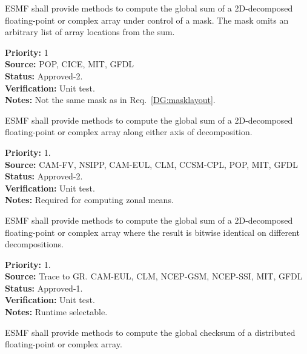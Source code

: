  \label{DG:masksum}

ESMF shall provide methods to compute the global sum of a 2D-decomposed
floating-point or complex array under control of a mask. The mask
omits an arbitrary list of array locations from the sum.

\begin{reqlist}
{\bf Priority:} 1 \\
{\bf Source:} POP, CICE, MIT, GFDL \\
{\bf Status:} Approved-2. \\
{\bf Verification:} Unit test. \\
{\bf Notes:} Not the same mask as in Req.~\ref{DG:masklayout}.
\end{reqlist}


ESMF shall provide methods to compute the global sum of a 2D-decomposed
floating-point or complex array along either axis of decomposition.

\begin{reqlist}
{\bf Priority:} 1. \\
{\bf Source:} CAM-FV, NSIPP, CAM-EUL, CLM, CCSM-CPL, POP, MIT, GFDL \\
{\bf Status:} Approved-2. \\
{\bf Verification:} Unit test. \\
{\bf Notes:} Required for computing zonal means.
\end{reqlist}


ESMF shall provide methods to compute the global sum of a
2D-decomposed floating-point or complex array where the result is
bitwise identical on different decompositions.

\begin{reqlist}
{\bf Priority:} 1. \\ 
{\bf Source:} Trace to GR. CAM-EUL, CLM, NCEP-GSM, NCEP-SSI, MIT, GFDL \\
{\bf Status:} Approved-1. \\
{\bf Verification:} Unit test. \\
{\bf Notes:} Runtime selectable.
\end{reqlist}


ESMF shall provide methods to compute the global checksum of a
distributed floating-point or complex array. 

